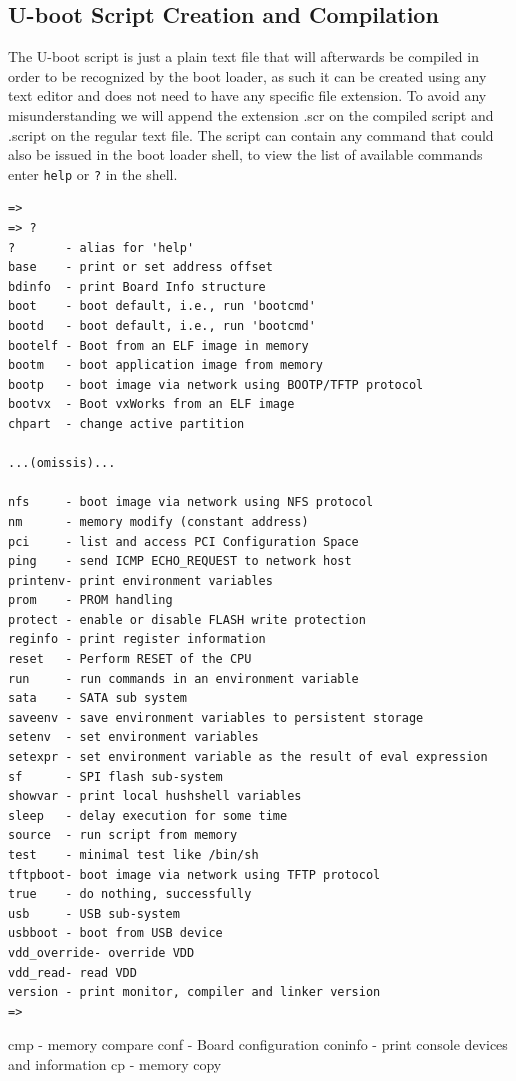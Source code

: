 \documentclass[11pt
  , a4paper
  , article
  , oneside
  , showtrims
]{memoir}
\begin{document}
\subsection{U-boot Script Creation and Compilation}
The U-boot script is just a plain text file that will afterwards be compiled in order to be recognized by the boot loader, as such it can be created using any text editor and does not need to have any specific file extension.
To avoid any misunderstanding we will append the extension .scr on the compiled script and .script on the regular text file.
The script can contain any command that could also be issued in the boot loader shell, to view the list of available commands enter \texttt{help} or \texttt{?} in the shell.

\begin{lstlisting}[style=termstyle]
=>
=> ?
?       - alias for 'help'
base    - print or set address offset
bdinfo  - print Board Info structure
boot    - boot default, i.e., run 'bootcmd'
bootd   - boot default, i.e., run 'bootcmd'
bootelf - Boot from an ELF image in memory
bootm   - boot application image from memory
bootp   - boot image via network using BOOTP/TFTP protocol
bootvx  - Boot vxWorks from an ELF image
chpart  - change active partition

...(omissis)...

nfs     - boot image via network using NFS protocol
nm      - memory modify (constant address)
pci     - list and access PCI Configuration Space
ping    - send ICMP ECHO_REQUEST to network host
printenv- print environment variables
prom    - PROM handling
protect - enable or disable FLASH write protection
reginfo - print register information
reset   - Perform RESET of the CPU
run     - run commands in an environment variable
sata    - SATA sub system
saveenv - save environment variables to persistent storage
setenv  - set environment variables
setexpr - set environment variable as the result of eval expression
sf      - SPI flash sub-system
showvar - print local hushshell variables
sleep   - delay execution for some time
source  - run script from memory
test    - minimal test like /bin/sh
tftpboot- boot image via network using TFTP protocol
true    - do nothing, successfully
usb     - USB sub-system
usbboot - boot from USB device
vdd_override- override VDD
vdd_read- read VDD
version - print monitor, compiler and linker version
=>
\end{lstlisting}
\iffalse
cmp     - memory compare
conf    - Board configuration
coninfo - print console devices and information
cp      - memory copy
\end{document}
